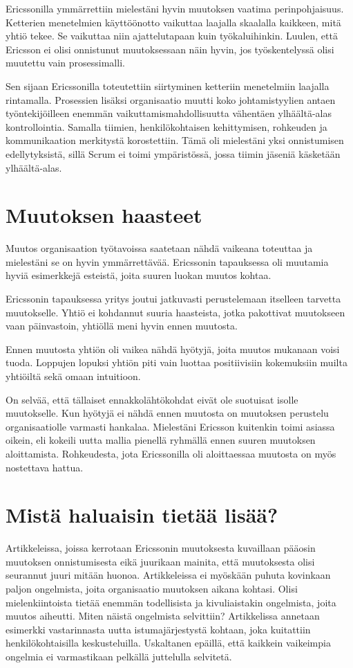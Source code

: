 \documentclass[a4paper]{article}
\begin{document}
Ericssonilla ymmärrettiin mielestäni hyvin muutoksen vaatima perinpohjaisuus. Ketterien menetelmien käyttöönotto vaikuttaa laajalla skaalalla kaikkeen, mitä yhtiö tekee. Se vaikuttaa niin ajattelutapaan kuin työkaluihinkin. Luulen, että Ericsson ei olisi onnistunut muutoksessaan näin hyvin, jos työskentelyssä olisi muutettu vain prosessimalli.

Sen sijaan Ericssonilla toteutettiin siirtyminen ketteriin menetelmiin laajalla rintamalla. Prosessien lisäksi organisaatio muutti koko johtamistyylien antaen työntekijöilleen enemmän vaikuttamismahdollisuutta vähentäen ylhäältä-alas kontrollointia. Samalla tiimien, henkilökohtaisen kehittymisen, rohkeuden ja kommunikaation merkitystä korostettiin. Tämä oli mielestäni yksi onnistumisen edellytyksistä, sillä Scrum ei toimi ympäristössä, jossa tiimin jäseniä käsketään ylhäältä-alas.

\section{Muutoksen haasteet}

Muutos organisaation työtavoissa saatetaan nähdä vaikeana toteuttaa ja mielestäni se on hyvin ymmärrettävää. Ericssonin tapauksessa oli muutamia hyviä esimerkkejä esteistä, joita suuren luokan muutos kohtaa.

Ericssonin tapauksessa yritys joutui jatkuvasti perustelemaan itselleen tarvetta muutokselle. Yhtiö ei kohdannut suuria haasteista, jotka pakottivat muutokseen vaan päinvastoin, yhtiöllä meni hyvin ennen muutosta. \citep{mikkonen2011}

Ennen muutosta yhtiön oli vaikea nähdä hyötyjä, joita muutos mukanaan voisi tuoda. Loppujen lopuksi yhtiön piti vain luottaa positiivisiin kokemuksiin muilta yhtiöiltä sekä omaan intuitioon.

On selvää, että tällaiset ennakkolähtökohdat eivät ole suotuisat isolle muutokselle. Kun hyötyjä ei nähdä ennen muutosta on muutoksen perustelu organisaatiolle varmasti hankalaa. Mielestäni Ericsson kuitenkin toimi asiassa oikein, eli kokeili uutta mallia pienellä ryhmällä ennen suuren muutoksen aloittamista. Rohkeudesta, jota Ericssonilla oli aloittaessaa muutosta on myös nostettava hattua.

\section{Mistä haluaisin tietää lisää?}

Artikkeleissa, joissa kerrotaan Ericssonin muutoksesta \citep{mikkonen2011} \citep{hallikainen2012} kuvaillaan pääosin muutoksen onnistumisesta eikä juurikaan mainita, että muutoksesta olisi seurannut juuri mitään huonoa. Artikkeleissa ei myöskään puhuta kovinkaan paljon ongelmista, joita organisaatio muutoksen aikana kohtasi. Olisi mielenkiintoista tietää enemmän todellisista ja kivuliaistakin ongelmista, joita muutos aiheutti. Miten näistä ongelmista selvittiin? Artikkelissa annetaan esimerkki vastarinnasta uutta istumajärjestystä kohtaan, joka kuitattiin henkilökohtaisilla keskusteluilla. Uskaltanen epäillä, että kaikkein vaikeimpia ongelmia ei varmastikaan pelkällä juttelulla selvitetä.
\end{document}
